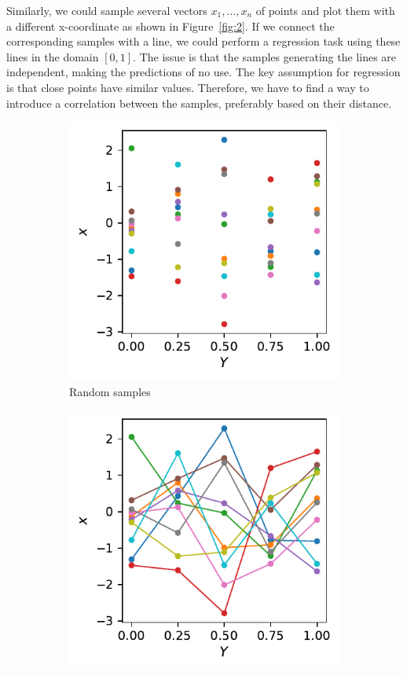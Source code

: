 Similarly, we could sample several vectors $x_1,\ldots,x_n$ of points and plot them with a different x-coordinate as shown in Figure~\ref{fig:2}. If we connect the corresponding samples with a line, we could perform a regression task using these lines in the domain $[0,1]$. The issue is that the samples generating the lines are independent, making the predictions of no use. The key assumption for regression is that close points have similar values. Therefore, we have to find a way to introduce a correlation between the samples, preferably based on their distance.

\begin{figure}
    \centering
    \begin{subfigure}{0.49\textwidth}
        \centering
        \includegraphics[scale=0.8]{img/10_gaussians.pdf}
        \caption{Random samples}
    \end{subfigure}
    \hfill
    \begin{subfigure}{0.49\textwidth}
        \centering
        \includegraphics[scale=0.8]{img/10_gaussians_conn.pdf}

\end{subfigure}
\end{figure}
